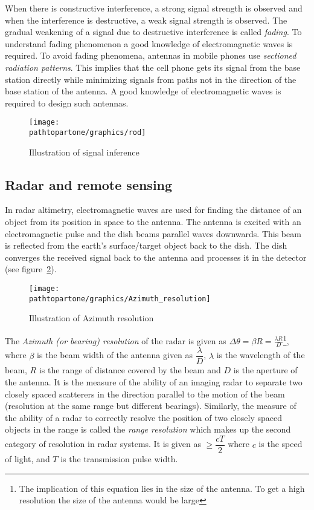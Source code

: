 When there is constructive interference, a strong signal strength is observed and when the interference is destructive, a weak signal strength is observed. The gradual weakening of a signal due to destructive interference is called \textit{fading}. To understand fading phenomenon a good knowledge of electromagnetic waves is required. To avoid fading phenomena, antennas in mobile phones use \textit{sectioned radiation patterns}. This implies that the cell phone gets its signal from the base station directly while minimizing signals from paths not in the direction of the base station of the antenna. A good knowledge of electromagnetic waves is required to design such antennas.
\begin{figure}[h]
\centering
\texttt{[image: \\pathtopartone/graphics/rod]}
\caption{Illustration of signal inference}
\label{fig:rod}
\end{figure}

\subsection{Radar and remote sensing}
In radar altimetry, electromagnetic waves are used for finding the distance of an object from its position in space to the antenna. The antenna is excited with an electromagnetic pulse and the dish beams parallel waves downwards. This beam is reflected from the earth's surface/target object back to the dish. The dish converges the received signal back to the antenna and processes it in the detector (see figure~\ref{fig:new}).
\begin{figure}[h]
\centering
\texttt{[image: \\pathtopartone/graphics/Azimuth\_resolution]}
\caption{Illustration of Azimuth resolution}
\label{fig:new}
\end{figure}

The \textit{Azimuth (or bearing) resolution} of the radar is given as $\Delta \theta = \beta R = \frac{\lambda R}{D}$\footnote{The implication of this equation lies in the size of the antenna. To get a high resolution the size of the antenna would be large}, where $\beta$ is the beam width of the antenna given as $\dfrac{\lambda}{D}$, $\lambda$ is the wavelength of the beam, $R$ is the range of distance covered by the beam and $D$ is the aperture of the antenna. It is the measure of the ability of an imaging radar to separate two closely spaced scatterers in the direction parallel to the motion of the beam (resolution at the same range but different bearings). Similarly, the measure of the ability of a radar to correctly resolve the position of two closely spaced objects in the range is called the \textit{range resolution} which makes up the second category of resolution in radar systems. It is given as $\geq \dfrac{cT}{2}$ where $c$ is the speed of light, and $T$ is the transmission pulse width.


